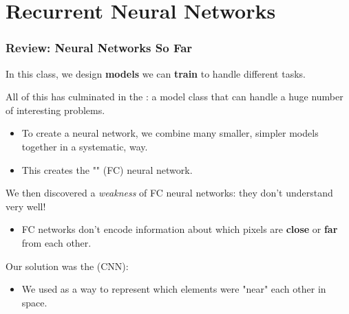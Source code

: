 

\setcounter{chapter}{10-1} %

\chapter{Recurrent Neural Networks}

    \subsection{Review: Neural Networks So Far}

        In this class, we design \textbf{models} we can \textbf{train} to handle different tasks.
        
        All of this has culminated in the : a model class that can handle a huge number of interesting problems.
        
            \begin{itemize}
                \item To create a neural network, we combine many smaller, simpler models together in a systematic,  way.

                \item This creates the "" (FC) neural network.
            \end{itemize}
        
        We then discovered a \textit{weakness} of FC neural networks: they don't understand  very well! 
            \begin{itemize}
                \item \miniex FC networks don't encode information about which pixels are \textbf{close} or \textbf{far} from each other.
            \end{itemize}
            
        Our solution was the  (CNN): 
        \begin{itemize}
            \item We used  as a way to represent which elements were "near" each other in space.
        \end{itemize}




